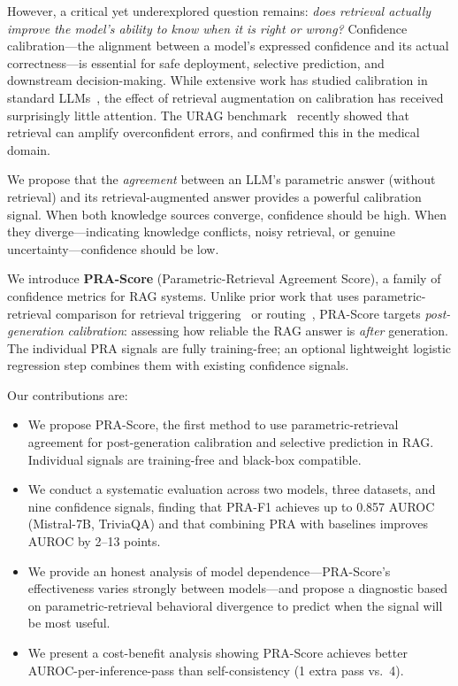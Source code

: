 \documentclass{article}
\begin{document}
However, a critical yet underexplored question remains: \emph{does retrieval actually improve the model's ability to know when it is right or wrong?} Confidence calibration---the alignment between a model's expressed confidence and its actual correctness---is essential for safe deployment, selective prediction, and downstream decision-making. While extensive work has studied calibration in standard LLMs~\citep{kadavath2022language,kuhn2023semantic}, the effect of retrieval augmentation on calibration has received surprisingly little attention. The URAG benchmark~\citep{nguyen2026urag} recently showed that retrieval can amplify overconfident errors, and \citet{ozaki2025understanding} confirmed this in the medical domain.

We propose that the \emph{agreement} between an LLM's parametric answer (without retrieval) and its retrieval-augmented answer provides a powerful calibration signal. When both knowledge sources converge, confidence should be high. When they diverge---indicating knowledge conflicts, noisy retrieval, or genuine uncertainty---confidence should be low.

We introduce \textbf{PRA-Score} (Parametric-Retrieval Agreement Score), a family of confidence metrics for RAG systems. Unlike prior work that uses parametric-retrieval comparison for retrieval triggering~\citep{chen2025pairs,zubkova2025sugar} or routing~\citep{wu2025selfrouting}, PRA-Score targets \emph{post-generation calibration}: assessing how reliable the RAG answer is \emph{after} generation. The individual PRA signals are fully training-free; an optional lightweight logistic regression step combines them with existing confidence signals.

Our contributions are:
\begin{itemize}
    \item We propose PRA-Score, the first method to use parametric-retrieval agreement for post-generation calibration and selective prediction in RAG. Individual signals are training-free and black-box compatible.
    \item We conduct a systematic evaluation across two models, three datasets, and nine confidence signals, finding that PRA-F1 achieves up to 0.857 AUROC (Mistral-7B, TriviaQA) and that combining PRA with baselines improves AUROC by 2--13 points.
    \item We provide an honest analysis of model dependence---PRA-Score's effectiveness varies strongly between models---and propose a diagnostic based on parametric-retrieval behavioral divergence to predict when the signal will be most useful.
    \item We present a cost-benefit analysis showing PRA-Score achieves better AUROC-per-inference-pass than self-consistency (1 extra pass vs.\ 4).
\end{itemize}
\end{document}
